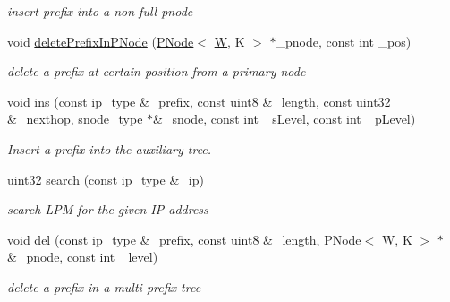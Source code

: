 \begin{DoxyCompactItemize}
\begin{DoxyCompactList}\small\item\em insert prefix into a non-\/full pnode \end{DoxyCompactList}\item 
void \hyperlink{classMPTree_a2f06bf88ea0b8d1de3392bd395814ecc}{delete\-Prefix\-In\-P\-Node} (\hyperlink{structPNode}{P\-Node}$<$ \hyperlink{test__u128_8cpp_ab21b528bc38899d04d3a7053e52fb797}{W}, K $>$ $\ast$\-\_\-pnode, const int \-\_\-pos)
\begin{DoxyCompactList}\small\item\em delete a prefix at certain position from a primary node \end{DoxyCompactList}\item 
void \hyperlink{classMPTree_a42e747e9c5affa8094e486729015288e}{ins} (const \hyperlink{classMPTree_a11032357a52017ffa6ad4e7ddedf3c23}{ip\-\_\-type} \&\-\_\-prefix, const \hyperlink{types_8h_a34ecedcf03a70dc91e4616212d79267d}{uint8} \&\-\_\-length, const \hyperlink{types_8h_abd01e8e67e3d94cab04ecaaf4f85ac1b}{uint32} \&\-\_\-nexthop, \hyperlink{classMPTree_a456aa661f3322ceae1d38bfbb39b572c}{snode\-\_\-type} $\ast$\&\-\_\-snode, const int \-\_\-s\-Level, const int \-\_\-p\-Level)
\begin{DoxyCompactList}\small\item\em Insert a prefix into the auxiliary tree. \end{DoxyCompactList}\item 
\hyperlink{types_8h_abd01e8e67e3d94cab04ecaaf4f85ac1b}{uint32} \hyperlink{classMPTree_aa15df626e27ba47239e7d7b71a9d6de4}{search} (const \hyperlink{classMPTree_a11032357a52017ffa6ad4e7ddedf3c23}{ip\-\_\-type} \&\-\_\-ip)
\begin{DoxyCompactList}\small\item\em search L\-P\-M for the given I\-P address \end{DoxyCompactList}\item 
void \hyperlink{classMPTree_a84bb0788175d919dfe0cc51f7346f10f}{del} (const \hyperlink{classMPTree_a11032357a52017ffa6ad4e7ddedf3c23}{ip\-\_\-type} \&\-\_\-prefix, const \hyperlink{types_8h_a34ecedcf03a70dc91e4616212d79267d}{uint8} \&\-\_\-length, \hyperlink{structPNode}{P\-Node}$<$ \hyperlink{test__u128_8cpp_ab21b528bc38899d04d3a7053e52fb797}{W}, K $>$ $\ast$\&\-\_\-pnode, const int \-\_\-level)
\begin{DoxyCompactList}\small\item\em delete a prefix in a multi-\/prefix tree \end{DoxyCompactList}\item 

\end{DoxyCompactItemize}

